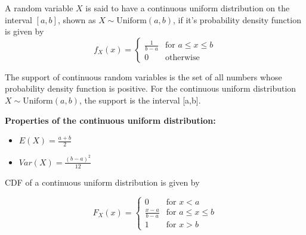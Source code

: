 \documentclass{tufte-handout}
\begin{document}
\begin{Definition}
    A random variable \( X \) is said to have a continuous uniform distribution on the interval
    \([a,b]\), shown as \( X \sim \text{Uniform}(a,b) \),
    if it's probability density function is given by
    \[ f_X(x) = \begin{cases}
        \frac{1}{b-a} & \text{for } a \leq x \leq b \\
        0 & \text{otherwise}
    \end{cases} \]
\end{Definition}


The support of continuous random variables is the set of all numbers whose
probability density function is positive. For the continuous uniform distribution \( X \sim \text{Uniform}(a,b) \),
the support is the interval [a,b].

\textbf{Properties of the continuous uniform distribution:}

\begin{itemize}
    \item \( E(X) = \frac{a+b}{2} \)
    \item \( Var(X) = \frac{(b-a)^2}{12} \)
\end{itemize}
CDF of a continuous uniform distribution is given by

\[ F_X(x) = \begin{cases}
    0 & \text{for } x < a \\
    \frac{x-a}{b-a} & \text{for } a \leq x \leq b \\
    1 & \text{for } x > b
\end{cases} \]
\end{document}
